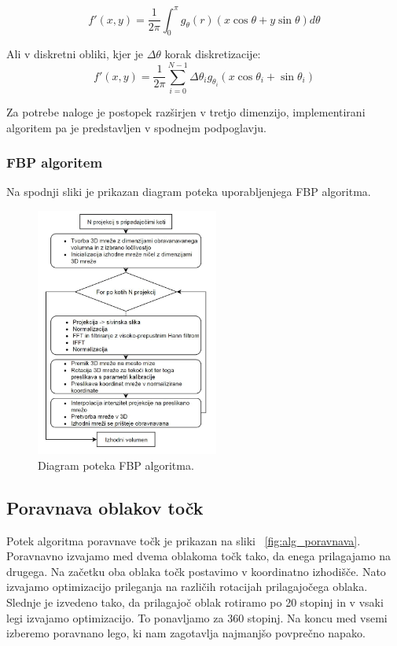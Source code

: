 \documentclass[journal,a4paper,twoside]{sty/IEEEtran}
\begin{document}
\begin{equation}
f'(x,y) = \frac{1}{2\pi} \int_{0}^{\pi} g_{\theta}(r) (x \cos\theta + y \sin \theta)d\theta
\end{equation}

Ali v diskretni obliki, kjer je $\Delta\theta$ korak diskretizacije:
\begin{equation}
f'(x,y) = \frac{1}{2\pi} \sum\limits_{i=0}^{N-1} \Delta\theta_i g_{\theta_i}(x \cos\theta_i + \sin\theta_i)
\end{equation}

Za potrebe naloge je postopek razširjen v tretjo dimenzijo, implementirani algoritem pa je predstavljen v spodnejm podpoglavju.

\subsubsection{FBP algoritem}

Na spodnji sliki je prikazan diagram poteka uporabljenjega FBP algoritma.

\begin{figure}[H]
	\centerline{\includegraphics[width=6cm]{fig/FBPflow}}
	\caption{Diagram poteka FBP algoritma.}
	\label{fig:fbp_flow}
\end{figure}

\subsection{Poravnava oblakov točk}
%
Potek algoritma poravnave točk je prikazan na sliki ~\ref{fig:alg_poravnava}. Poravnavno izvajamo med dvema oblakoma točk tako, da enega prilagajamo na drugega. Na začetku oba oblaka točk postavimo v koordinatno izhodišče. Nato izvajamo optimizacijo prileganja na različih rotacijah prilagajočega oblaka. Slednje je izvedeno tako, da prilagajoč oblak rotiramo po 20 stopinj in v vsaki legi izvajamo optimizacijo. To ponavljamo za 360 stopinj. Na koncu med vsemi izberemo poravnano lego, ki nam zagotavlja najmanjšo povprečno napako. 
\end{document}
